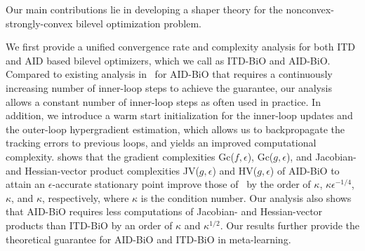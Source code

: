 \documentclass{osudissert96}
\begin{document}
\vspace{0.2cm}
 Our main contributions lie in developing a shaper theory for the nonconvex-strongly-convex bilevel optimization problem. 

We first provide a unified convergence rate and complexity analysis for both ITD and  AID based bilevel optimizers, which we call as ITD-BiO and AID-BiO. Compared to existing analysis in~\cite{ghadimi2018approximation} for AID-BiO that requires a continuously increasing number of inner-loop steps to achieve the guarantee, our analysis allows a constant number of inner-loop steps as often used in practice. In addition, we introduce a warm start initialization for the inner-loop updates and the outer-loop hypergradient estimation,  which allows us to backpropagate the tracking errors to previous loops, and yields an improved computational complexity.  shows that the gradient complexities Gc($f,\epsilon$), Gc($g,\epsilon$), and Jacobian- and Hessian-vector product complexities JV($g,\epsilon$) and HV($g,\epsilon$) of AID-BiO to attain an $\epsilon$-accurate stationary point improve those of~\cite{ghadimi2018approximation} by the order of $\kappa$, $\kappa\epsilon^{-1/4}$, $\kappa$, and $\kappa$, respectively, where $\kappa$ is the condition number. Our analysis also shows that AID-BiO requires less computations of Jacobian- and Hessian-vector products than ITD-BiO by an order of $\kappa$ and $\kappa^{1/2}$. Our results further provide the theoretical guarantee for AID-BiO and ITD-BiO in meta-learning. 
\end{document}
